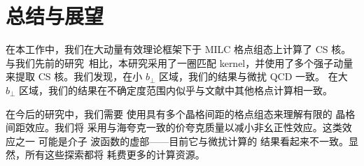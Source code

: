 \section{总结与展望}
\label{sec:summary}

在本工作中，我们在大动量有效理论框架下于 MILC 格点组态上计算了 CS 核。与我们先前的研究~\cite{LatticeParton:2020uhz}相比，本研究采用了一圈匹配 kernel，并使用了多个强子动量来提取 CS 核。我们发现，在小 $b_{\perp}$ 区域，我们的结果与微扰 QCD 一致。
在大 $b_{\perp}$ 区域，我们的结果在不确定度范围内似乎与文献中其他格点计算相一致。

在今后的研究中，我们需要
使用具有多个晶格间距的格点组态来理解有限的
晶格间距效应。我们将
采用与海夸克一致的价夸克质量以减小非幺正性效应。这类效应之一
可能是介子
波函数的虚部——目前它与微扰计算的
结果看起来不一致。显然，所有这些探索都将
耗费更多的计算资源。

